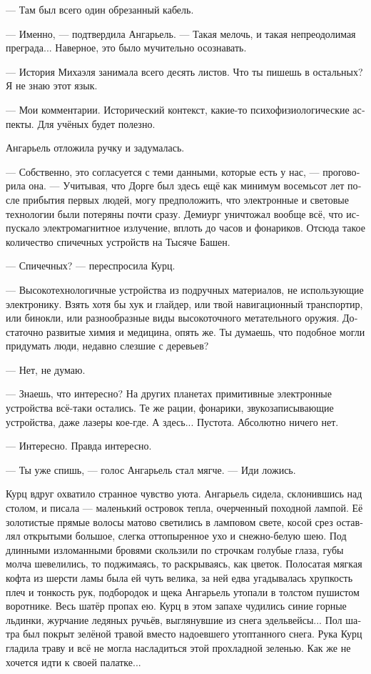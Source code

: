 \documentclass[a4paper,12pt,fleqn]{book}\usepackage{cooltooltips}\usepackage{polyglossia}\setdefaultlanguage[babelshorthands=true]{russian}\setotherlanguage{english}\defaultfontfeatures{Ligatures=TeX,Mapping=tex-text} \usepackage{xcolor}\definecolor{lightgray}{HTML}{bbbbbb}\color{lightgray}\newcommand{\ml}[3]{\textenglish{\textcolor{black}{#3}}}
\begin{document}
--- Там был всего один обрезанный кабель.

--- Именно, --- подтвердила Ангарьель.
--- Такая мелочь, и такая непреодолимая преграда...
Наверное, это было мучительно осознавать.

--- История Михаэля занимала всего десять листов.
Что ты пишешь в остальных?
Я не знаю этот язык.

--- Мои комментарии.
Исторический контекст, какие-то психофизиологические аспекты.
Для учёных будет полезно.

Ангарьель отложила ручку и задумалась.

--- Собственно, это согласуется с теми данными, которые есть у нас, --- проговорила она.
--- Учитывая, что Дорге был здесь ещё как минимум восемьсот лет после прибытия первых людей, могу предположить, что электронные и световые технологии были потеряны почти сразу.
Демиург уничтожал вообще всё, что испускало электромагнитное излучение, вплоть до часов и фонариков.
Отсюда такое количество спичечных устройств на Тысяче Башен.

--- Спичечных? --- переспросила Курц.

--- Высокотехнологичные устройства из подручных материалов, не использующие электронику.
Взять хотя бы хук и глайдер, или твой навигационный транспортир, или бинокли, или разнообразные виды высокоточного метательного оружия.
Достаточно развитые химия и медицина, опять же.
Ты думаешь, что подобное могли придумать люди, недавно слезшие с деревьев?

--- Нет, не думаю.

--- Знаешь, что интересно?
На других планетах примитивные электронные устройства всё-таки остались.
Те же рации, фонарики, звукозаписывающие устройства, даже лазеры кое-где.
А здесь...
Пустота.
Абсолютно ничего нет.

--- Интересно.
Правда интересно.

--- Ты уже спишь, --- голос Ангарьель стал мягче.
--- Иди ложись.

Курц вдруг охватило странное чувство уюта.
Ангарьель сидела, склонившись над столом, и писала --- маленький островок тепла, очерченный походной лампой.
Её золотистые прямые волосы матово светились в ламповом свете, косой срез оставлял открытыми большое, слегка оттопыренное ухо и снежно-белую шею.
Под длинными изломанными  бровями скользили по строчкам голубые глаза, губы молча шевелились, то поджимаясь, то раскрываясь, как цветок.
Полосатая мягкая кофта из шерсти ламы была ей чуть велика, за ней едва угадывалась хрупкость плеч и тонкость рук, подбородок и щека Ангарьель утопали в толстом пушистом воротнике.
Весь шатёр пропах ею.
Курц в этом запахе чудились синие горные льдинки, журчание ледяных ручьёв, выглянувшие из снега эдельвейсы...
Пол шатра был покрыт зелёной травой вместо надоевшего утоптанного снега.
Рука Курц гладила траву и всё не могла насладиться этой прохладной зеленью.
Как же не хочется идти к своей палатке...
\end{document}
